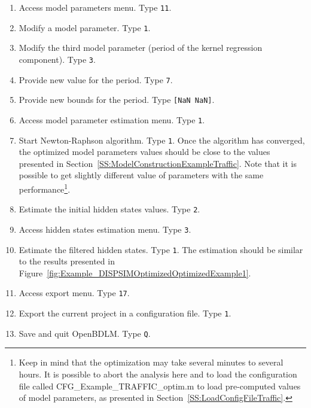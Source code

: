 \begin{enumerate}
\item Access model parameters menu. Type \colorbox{light-gray}{\lstinline[basicstyle = \mlttfamily \small, backgroundcolor = \color{light-gray}]!11!}.
\item Modify a model parameter. Type \colorbox{light-gray}{\lstinline[basicstyle = \mlttfamily \small, backgroundcolor = \color{light-gray}]!1!}.
\item Modify the third model parameter (period of the kernel regression component). Type \colorbox{light-gray}{\lstinline[basicstyle = \mlttfamily \small, backgroundcolor = \color{light-gray}]!3!}.
\item Provide new value for  the period. Type \colorbox{light-gray}{\lstinline[basicstyle = \mlttfamily \small, backgroundcolor = \color{light-gray}]!7!}.
\item Provide new bounds for the period. Type \colorbox{light-gray}{\lstinline[basicstyle = \mlttfamily \small, backgroundcolor = \color{light-gray}]![NaN NaN]!}.
\item Access model parameter estimation menu. Type \colorbox{light-gray}{\lstinline[basicstyle = \mlttfamily \small, backgroundcolor = \color{light-gray}]!1!}. 
\item Start Newton-Raphson algorithm. Type \colorbox{light-gray}{\lstinline[basicstyle = \mlttfamily \small, backgroundcolor = \color{light-gray}]!1!}. Once the algorithm has converged, the optimized model parameters values should be close to the values presented in Section~\ref{SS:ModelConstructionExampleTraffic}. Note that it is possible to get slightly different value of parameters with the same performance\footnote{Keep in mind that the optimization may take several minutes to several hours. It is possible to abort the analysis here and to load the configuration file called CFG\_Example\_TRAFFIC\_optim.m to load pre-computed values of model parameters, as presented in Section~\ref{SS:LoadConfigFileTraffic}.}.
\item Estimate the initial hidden states values. Type \colorbox{light-gray}{\lstinline[basicstyle = \mlttfamily \small, backgroundcolor = \color{light-gray}]!2!}.
\item Access hidden states estimation menu. Type \colorbox{light-gray}{\lstinline[basicstyle = \mlttfamily \small, backgroundcolor = \color{light-gray}]!3!}. 
\item Estimate the filtered hidden states. Type \colorbox{light-gray}{\lstinline[basicstyle = \mlttfamily \small, backgroundcolor = \color{light-gray}]!1!}. The estimation should be similar to the results presented in Figure~\ref{fig:Example_DISPSIMOptimizedOptimizedExample1}.
\item Access export menu. Type \colorbox{light-gray}{\lstinline[basicstyle = \mlttfamily \small, backgroundcolor = \color{light-gray}]!17!}. 
\item Export the current project in a configuration file. Type \colorbox{light-gray}{\lstinline[basicstyle = \mlttfamily \small, backgroundcolor = \color{light-gray}]!1!}.
\item Save and quit OpenBDLM. Type \colorbox{light-gray}{\lstinline[basicstyle = \mlttfamily \small, backgroundcolor = \color{light-gray}]!Q!}.
\end{enumerate}


